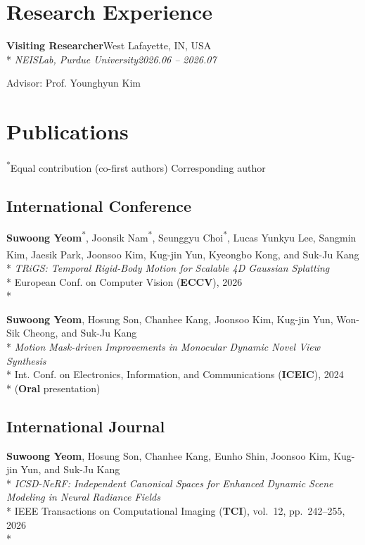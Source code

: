 \documentclass[10pt]{article}
\newcommand{\me}{\textbf{Suwoong Yeom}}
\newcommand{\eq}{\textsuperscript{*}}
\newcommand{\corr}{\textsuperscript{\dag}}
\newcommand{\entry}[4]{%
  \item \textbf{#1}\hfill #2\\*
  \textit{#3}\hfill\textit{#4}}
\newcommand{\pub}[5]{%
  \item[{[#1]}] #2\\*
  \textit{#3}\\*
  #4%
  \if\relax\detokenize{#5}\relax\else\\* #5\fi}
\begin{document}
\section{Research Experience}
\begin{entries}
  \entry{Visiting Researcher}{West Lafayette, IN, USA}
        {NEISLab, Purdue University}{2026.06 -- 2026.07}
  \begin{details}
    \item Advisor: Prof. Younghyun Kim
  \end{details}
\end{entries}

\section{Publications}
{\small \eq Equal contribution (co-first authors) \quad \corr Corresponding author}

\subsection{International Conference}
\begin{pubs}
  \pub{C2}
      {\me\eq, Joonsik Nam\eq, Seunggyu Choi\eq, Lucas Yunkyu Lee, Sangmin Kim, Jaesik Park,
       Joonsoo Kim, Kug-jin Yun, Kyeongbo Kong\corr, and Suk-Ju Kang\corr}
      {TRiGS: Temporal Rigid-Body Motion for Scalable 4D Gaussian Splatting}
      {European Conf. on Computer Vision (\textbf{ECCV}), 2026}
      {}

  \pub{C1}
      {\me, Hosung Son, Chanhee Kang, Joonsoo Kim, Kug-jin Yun, Won-Sik Cheong, and Suk-Ju Kang}
      {Motion Mask-driven Improvements in Monocular Dynamic Novel View Synthesis}
      {Int. Conf. on Electronics, Information, and Communications (\textbf{ICEIC}), 2024}
      {(\textbf{Oral} presentation)}
\end{pubs}

\subsection{International Journal}
\begin{pubs}
  \pub{J1}
      {\me, Hosung Son, Chanhee Kang, Eunho Shin, Joonsoo Kim, Kug-jin Yun, and Suk-Ju Kang}
      {ICSD-NeRF: Independent Canonical Spaces for Enhanced Dynamic Scene Modeling in Neural Radiance Fields}
      {IEEE Transactions on Computational Imaging (\textbf{TCI}), vol.~12, pp.~242--255, 2026}
      {}
\end{pubs}
\end{document}
